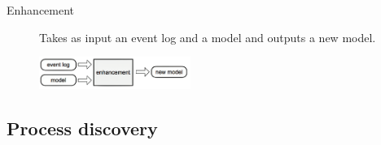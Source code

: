 \begin{description}
\begin{description}
            \item[Enhancement] 
                Takes as input an event log and a model and outputs a new model.
                \begin{center}
                    \includegraphics[width=0.4\textwidth]{img/process_mining_enhancement.png}
                \end{center}
        \end{description}
\end{description}


\subsection{Process discovery}

